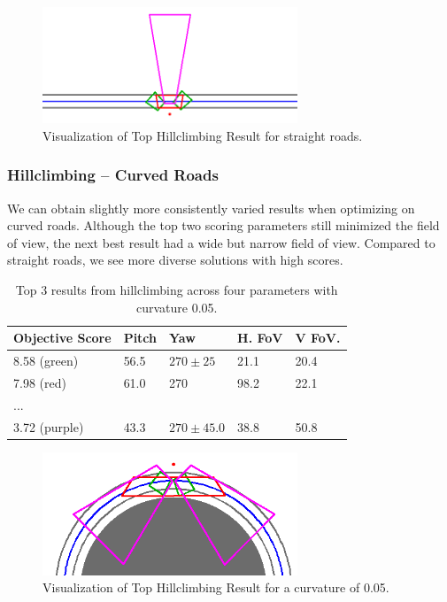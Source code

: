 \documentclass[a4paper,12pt,twoside,openright]{report}
\begin{document}
\begin{figure}[htb]
    \centering
    \includegraphics[width=3in]{figures/simple_objective/top_hillclimb.png}
    \caption[Top Hillclimbing Result]{Visualization of Top Hillclimbing Result for straight roads.}
    \label{fig:simpleobjective:hillclimbing straight}
\end{figure}

\subsubsection{Hillclimbing -- Curved Roads}

We can obtain slightly more consistently varied results when optimizing
on curved roads. Although the top two scoring parameters
still minimized the field of view, the next best result
had a wide but narrow field of view. Compared to straight roads,
we see more diverse solutions with high scores.

\begin{table}[htb]
    \centering
    \caption[Hillclimbing Top Scorers]{Top 3 results from hillclimbing across four parameters with curvature 0.05.}
    \label{tab:simpleobjective:hillclimb}
    \begin{tabular}{@{}lllll@{}}
        \toprule
        Objective Score & Pitch & Yaw        & H. FoV & V FoV. \\ \midrule
        8.58  (green)   & 56.5 & $270\pm25$ & 21.1  & 20.4  \\
        7.98  (red)     & 61.0 & 270     & 98.2  & 22.1  \\ 
        ... \\
        3.72  (purple)  & 43.3  &  $270\pm45.0$ & 38.8   & 50.8   \\ \bottomrule
    \end{tabular}
\end{table}

\begin{figure}[htb]
    \centering
    \includegraphics[width=3in]{figures/simple_objective/hillclimb_curvature.png}
    \caption[Top Hillclimbing Result]{Visualization of Top Hillclimbing Result for a curvature of 0.05.}
    \label{fig:simpleobjective:hillclimb result}
\end{figure}
\end{document}

